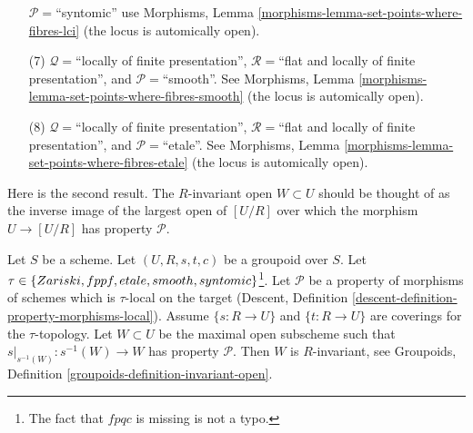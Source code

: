 \begin{remark}
\begin{enumerate}
$\mathcal{P}=$``syntomic'' use
Morphisms, Lemma \ref{morphisms-lemma-set-points-where-fibres-lci}
(the locus is automically open).
\item[(7)] $\mathcal{Q} =$``locally of finite presentation'',
$\mathcal{R} =$``flat and locally of finite presentation'', and
$\mathcal{P}=$``smooth''. See
Morphisms, Lemma \ref{morphisms-lemma-set-points-where-fibres-smooth}
(the locus is automically open).
\item[(8)] $\mathcal{Q} =$``locally of finite presentation'',
$\mathcal{R} =$``flat and locally of finite presentation'', and
$\mathcal{P}=$``etale''. See
Morphisms, Lemma \ref{morphisms-lemma-set-points-where-fibres-etale}
(the locus is automically open).
\end{enumerate}
\end{remark}

\noindent
Here is the second result. The $R$-invariant open $W \subset U$ should be
thought of as the inverse image of the largest open of $[U/R]$ over which
the morphism $U \to [U/R]$ has property $\mathcal{P}$.

\begin{lemma}
\label{lemma-property-invariant}
Let $S$ be a scheme.
Let $(U, R, s, t, c)$ be a groupoid over $S$.
Let $\tau \in \{Zariski,\linebreak[0] fppf, \linebreak[0] etale,\linebreak[0]
smooth,\linebreak[0] syntomic\}$\footnote{The fact that $fpqc$ is missing
is not a typo.}. Let $\mathcal{P}$ be a property of morphisms of schemes
which is $\tau$-local on the target
(Descent, Definition \ref{descent-definition-property-morphisms-local}).
Assume $\{s : R \to U\}$ and $\{t : R \to U\}$ are coverings for the
$\tau$-topology. Let $W \subset U$ be the maximal open subscheme such that
$s|_{s^{-1}(W)} : s^{-1}(W) \to W$ has property $\mathcal{P}$.
Then $W$ is $R$-invariant, see
Groupoids, Definition \ref{groupoids-definition-invariant-open}.
\end{lemma}


